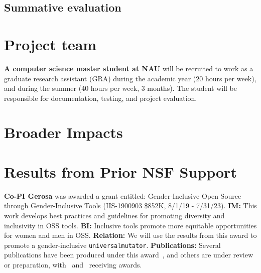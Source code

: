 \documentclass[numbers]{proposalnsf}
\newcommand{\um}{\texttt{universalmutator}}
\begin{document}
\subsection{Summative evaluation}

\section{Project team}


\textbf{A computer science master student at NAU} will be recruited to work as a graduate research assistant (GRA) during the academic year (20 hours per week), and during the summer (40 hours per week, 3 months).
The student will be responsible for documentation, testing, and project evaluation.

\section{Broader Impacts}



\section{Results from Prior NSF Support}



\textbf{Co-PI Gerosa} was awarded a grant entitled: Gender-Inclusive Open Source through Gender-Inclusive Tools (IIS-1900903 \$852K, 8/1/19 - 7/31/23). 
\textbf{IM:} This work develops best practices and guidelines for promoting diversity and inclusivity in OSS tools. 
\textbf{BI:} Inclusive tools promote more equitable opportunities for women and men in OSS. 
\textbf{Relation:} We will use the results from this award to promote a gender-inclusive  \um.
\textbf{Publications:} Several publications have been produced under this award~\cite{balali2020recommending,dias2021makes,silva2020google,gerosa2021shifting,silva2020theory,trinkenreich2020hidden,chatterjee2021aid,mendez2019gendermag,stumpf2020gender,guizani2020gender,hilderbrand2020engineering,padala2020gender,wessel2020effects}, and others are under review or preparation, with~\cite{balali2020recommending} and~\cite{wessel2020effects} receiving awards. 


\newpage
%


\end{document}
